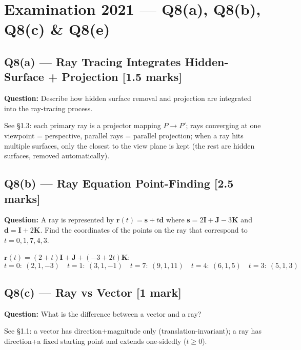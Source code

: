 \documentclass[12pt, a4paper]{article}
\newenvironment{solutionbox}{\begin{mdframed}[style=solutionframe]}{\end{mdframed}}
\newenvironment{answerbox}{\begin{mdframed}[style=answerframe]}{\end{mdframed}}
\begin{document}
\section{Examination 2021 --- Q8(a), Q8(b), Q8(c) \& Q8(e)}

\subsection*{Q8(a) --- Ray Tracing Integrates Hidden-Surface + Projection [1.5 marks]}
\begin{solutionbox}
\textbf{Question:} Describe how hidden surface removal and projection are integrated into the ray-tracing process.
\end{solutionbox}
\begin{answerbox}
See \S1.3: each primary ray is a projector mapping $P\to P'$; rays converging at one viewpoint = perspective, parallel rays = parallel projection; when a ray hits multiple surfaces, only the closest to the view plane is kept (the rest are hidden surfaces, removed automatically).
\end{answerbox}

\subsection*{Q8(b) --- Ray Equation Point-Finding [2.5 marks]}
\begin{solutionbox}
\textbf{Question:} A ray is represented by $\mathbf{r}(t)=\mathbf{s}+t\mathbf{d}$ where $\mathbf{s}=2\mathbf{I}+\mathbf{J}-3\mathbf{K}$ and $\mathbf{d}=\mathbf{I}+2\mathbf{K}$. Find the coordinates of the points on the ray that correspond to $t=0,1,7,4,3$.
\end{solutionbox}
\begin{answerbox}
$\mathbf{r}(t)=(2+t)\mathbf{I}+\mathbf{J}+(-3+2t)\mathbf{K}$:
$$t{=}0{:}\ (2,1,-3)\quad t{=}1{:}\ (3,1,-1)\quad t{=}7{:}\ (9,1,11)\quad t{=}4{:}\ (6,1,5)\quad t{=}3{:}\ (5,1,3)$$
\end{answerbox}

\subsection*{Q8(c) --- Ray vs Vector [1 mark]}
\begin{solutionbox}
\textbf{Question:} What is the difference between a vector and a ray?
\end{solutionbox}
\begin{answerbox}
See \S1.1: a vector has direction+magnitude only (translation-invariant); a ray has direction+a fixed starting point and extends one-sidedly ($t\ge0$).
\end{answerbox}
\end{document}
